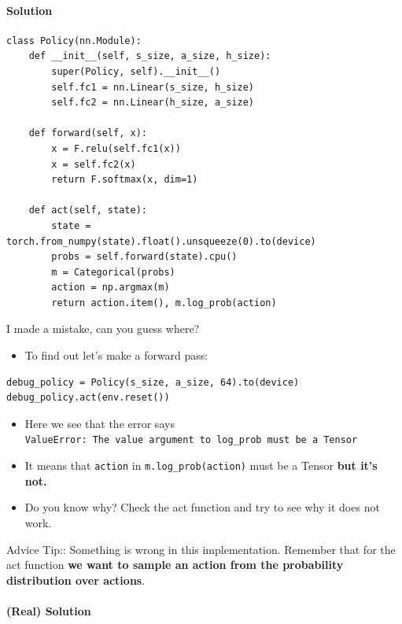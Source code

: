 \documentclass[11pt,a4paper]{article}
\begin{document}
\paragraph{Solution}\label{solution}

\begin{lstlisting}
class Policy(nn.Module):
    def __init__(self, s_size, a_size, h_size):
        super(Policy, self).__init__()
        self.fc1 = nn.Linear(s_size, h_size)
        self.fc2 = nn.Linear(h_size, a_size)

    def forward(self, x):
        x = F.relu(self.fc1(x))
        x = self.fc2(x)
        return F.softmax(x, dim=1)

    def act(self, state):
        state = torch.from_numpy(state).float().unsqueeze(0).to(device)
        probs = self.forward(state).cpu()
        m = Categorical(probs)
        action = np.argmax(m)
        return action.item(), m.log_prob(action)
\end{lstlisting}

I made a mistake, can you guess where?

\begin{itemize}
\tightlist
\item
  To find out let's make a forward pass:
\end{itemize}

\begin{lstlisting}
debug_policy = Policy(s_size, a_size, 64).to(device)
debug_policy.act(env.reset())
\end{lstlisting}

\begin{itemize}
\item
  Here we see that the error says \texttt{ValueError:\ The\ value\ argument\ to\ log\_prob\ must\ be\ a\ Tensor}
\item
  It means that \texttt{action} in \texttt{m.log\_prob(action)} must be a Tensor \textbf{but it's not.}
\item
  Do you know why? Check the act function and try to see why it does not work.
\end{itemize}

Advice Tip:: Something is wrong in this implementation. Remember that for the act function \textbf{we want to sample an action from the probability distribution over actions}.

\paragraph{(Real) Solution}\label{real-solution}
\end{document}
